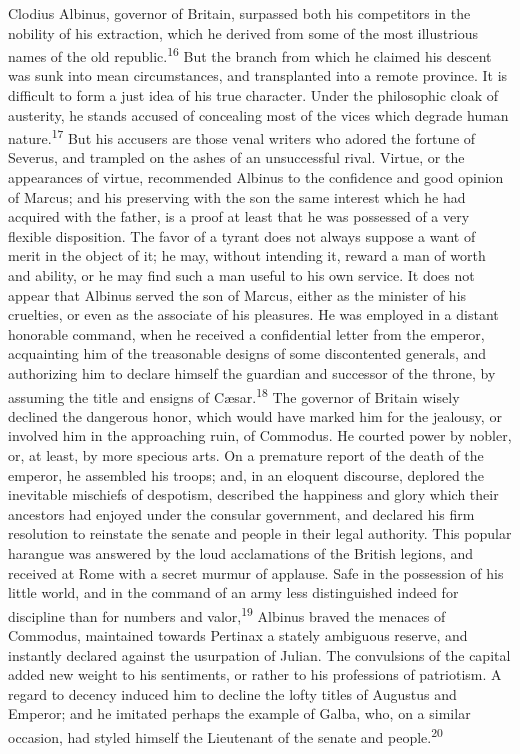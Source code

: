 Clodius Albinus, governor of Britain, surpassed both his
competitors in the nobility of his extraction, which he derived
from some of the most illustrious names of the old republic.\textsuperscript{16}
But the branch from which he claimed his descent was sunk into
mean circumstances, and transplanted into a remote province. It
is difficult to form a just idea of his true character. Under the
philosophic cloak of austerity, he stands accused of concealing
most of the vices which degrade human nature.\textsuperscript{17} But his accusers
are those venal writers who adored the fortune of Severus, and
trampled on the ashes of an unsuccessful rival. Virtue, or the
appearances of virtue, recommended Albinus to the confidence and
good opinion of Marcus; and his preserving with the son the same
interest which he had acquired with the father, is a proof at
least that he was possessed of a very flexible disposition. The
favor of a tyrant does not always suppose a want of merit in the
object of it; he may, without intending it, reward a man of worth
and ability, or he may find such a man useful to his own service.
It does not appear that Albinus served the son of Marcus, either
as the minister of his cruelties, or even as the associate of his
pleasures. He was employed in a distant honorable command, when
he received a confidential letter from the emperor, acquainting
him of the treasonable designs of some discontented generals, and
authorizing him to declare himself the guardian and successor of
the throne, by assuming the title and ensigns of Cæsar.\textsuperscript{18} The
governor of Britain wisely declined the dangerous honor, which
would have marked him for the jealousy, or involved him in the
approaching ruin, of Commodus. He courted power by nobler, or, at
least, by more specious arts. On a premature report of the death
of the emperor, he assembled his troops; and, in an eloquent
discourse, deplored the inevitable mischiefs of despotism,
described the happiness and glory which their ancestors had
enjoyed under the consular government, and declared his firm
resolution to reinstate the senate and people in their legal
authority. This popular harangue was answered by the loud
acclamations of the British legions, and received at Rome with a
secret murmur of applause. Safe in the possession of his little
world, and in the command of an army less distinguished indeed
for discipline than for numbers and valor,\textsuperscript{19} Albinus braved the
menaces of Commodus, maintained towards Pertinax a stately
ambiguous reserve, and instantly declared against the usurpation
of Julian. The convulsions of the capital added new weight to his
sentiments, or rather to his professions of patriotism. A regard
to decency induced him to decline the lofty titles of Augustus
and Emperor; and he imitated perhaps the example of Galba, who,
on a similar occasion, had styled himself the Lieutenant of the
senate and people.\textsuperscript{20}

